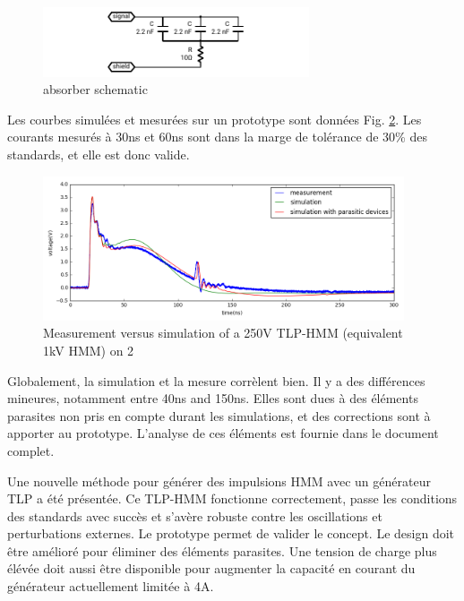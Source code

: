 \begin{figure}[!h]
  \centering
  \includegraphics[width=0.7\textwidth]{src/1/figures/absorber_schematic.pdf}
  \caption{absorber schematic}
  \label{fig:absorber_schematic}
\end{figure}

Les courbes simulées et mesurées sur un prototype sont données Fig. \ref{fig:tlp_hmm_waveforms}.
Les courants mesurés à 30ns et 60ns sont dans la marge de tolérance de 30\% des standards, et elle est donc valide.

\begin{figure}[!h]
  \centering
  \includegraphics[width=0.95\textwidth]{src/1/figures/tlp_hmm_waveforms.png}
  \caption{Measurement versus simulation of a 250V TLP-HMM (equivalent 1kV HMM) on 2\textOmega{}}
  \label{fig:tlp_hmm_waveforms}
\end{figure}

Globalement, la simulation et la mesure corrèlent bien.
Il y a des différences mineures, notamment entre 40ns and 150ns.
Elles sont dues à des éléments parasites non pris en compte durant les simulations, et des corrections sont à apporter au prototype.
L'analyse de ces éléments est fournie dans le document complet.

Une nouvelle méthode pour générer des impulsions HMM avec un générateur TLP a été présentée.
Ce TLP-HMM fonctionne correctement, passe les conditions des standards avec succès et s'avère robuste contre les oscillations et perturbations externes.
Le prototype permet de valider le concept.
Le design doit être amélioré pour éliminer des éléments parasites.
Une tension de charge plus élévée doit aussi être disponible pour augmenter la capacité en courant du générateur actuellement limitée à 4A.

